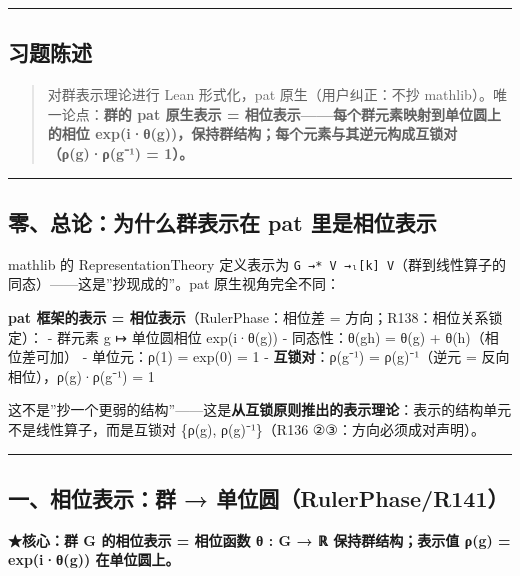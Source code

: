 \documentclass[
]{article}
\begin{document}
\begin{center}\rule{0.5\linewidth}{0.5pt}\end{center}

\subsection{习题陈述}\label{ux4e60ux9898ux9648ux8ff0}

\begin{quote}
对群表示理论进行 Lean 形式化，pat 原生（用户纠正：不抄
mathlib）。唯一论点：\textbf{群的 pat 原生表示 =
相位表示------每个群元素映射到单位圆上的相位
exp(i·θ(g))，保持群结构；每个元素与其逆元构成互锁对（ρ(g)·ρ(g⁻¹) =
1）。}
\end{quote}

\begin{center}\rule{0.5\linewidth}{0.5pt}\end{center}

\subsection{零、总论：为什么群表示在 pat
里是相位表示}\label{ux96f6ux603bux8bbaux4e3aux4ec0ux4e48ux7fa4ux8868ux793aux5728-pat-ux91ccux662fux76f8ux4f4dux8868ux793a}

mathlib 的 RepresentationTheory 定义表示为
\texttt{G\ →*\ V\ →ₗ{[}k{]}\ V}（群到线性算子的同态）------这是''抄现成的''。pat
原生视角完全不同：

\textbf{pat 框架的表示 = 相位表示}（RulerPhase：相位差 =
方向；R138：相位关系锁定）： - 群元素 g ↦ 单位圆相位 exp(i·θ(g)) -
同态性：θ(gh) = θ(g) + θ(h)（相位差可加） - 单位元：ρ(1) = exp(0) = 1 -
\textbf{互锁对}：ρ(g⁻¹) = ρ(g)⁻¹（逆元 = 反向相位），ρ(g)·ρ(g⁻¹) = 1

这不是''抄一个更弱的结构''------这是\textbf{从互锁原则推出的表示理论}：表示的结构单元不是线性算子，而是互锁对
\{ρ(g), ρ(g)⁻¹\}（R136 ②③：方向必须成对声明）。

\begin{center}\rule{0.5\linewidth}{0.5pt}\end{center}

\subsection{一、相位表示：群 →
单位圆（RulerPhase/R141）}\label{ux4e00ux76f8ux4f4dux8868ux793aux7fa4-ux5355ux4f4dux5706rulerphaser141}

\textbf{★核心：群 G 的相位表示 = 相位函数 θ : G → ℝ 保持群结构；表示值
ρ(g) = exp(i·θ(g)) 在单位圆上。}
\end{document}

